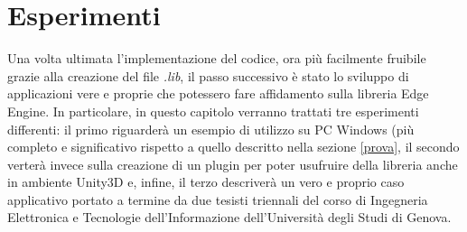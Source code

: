 \chapter{Esperimenti}
Una volta ultimata l’implementazione del codice, ora più facilmente fruibile grazie alla creazione del file \textit{.lib}, il passo successivo è stato lo sviluppo di applicazioni vere e proprie che potessero fare affidamento sulla libreria Edge Engine. In particolare, in questo capitolo verranno trattati tre esperimenti differenti: il primo riguarderà un esempio di utilizzo su PC Windows (più completo e significativo rispetto a quello descritto nella sezione \ref{prova}, il secondo verterà invece sulla creazione di un plugin per poter usufruire della libreria anche in ambiente Unity3D e, infine, il terzo descriverà un vero e proprio caso applicativo portato a termine da due tesisti triennali del corso di Ingegneria Elettronica e Tecnologie dell'Informazione dell'Università degli Studi di Genova.
